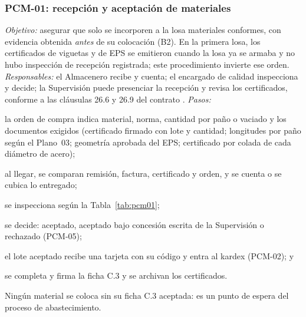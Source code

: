 \subsubsection{PCM-01: recepción y aceptación de materiales} \emph{Objetivo:} asegurar que solo se incorporen a la losa materiales conformes, con evidencia obtenida \emph{antes} de su colocación (B2). En la primera losa, los certificados de viguetas y de EPS se emitieron cuando la losa ya se armaba y no hubo inspección de recepción registrada; este procedimiento invierte ese orden. \emph{Responsables:} el Almacenero recibe y cuenta; el encargado de calidad inspecciona y decide; la Supervisión puede presenciar la recepción y revisa los certificados, conforme a las cláusulas 26.6 y 26.9 del contrato \parencite[p.~102]{uatf2025pao2}. \emph{Pasos:}
\begin{enumerate*}[label=(\arabic*)]
  \item la orden de compra indica material, norma, cantidad por paño o vaciado y los documentos exigidos (certificado firmado con lote y cantidad; longitudes por paño según el Plano~03; geometría aprobada del EPS; certificado por colada de cada diámetro de acero);
  \item al llegar, se comparan remisión, factura, certificado y orden, y se cuenta o se cubica lo entregado;
  \item se inspecciona según la Tabla~\ref{tab:pcm01};
  \item se decide: aceptado, aceptado bajo concesión escrita de la Supervisión o rechazado (PCM-05);
  \item el lote aceptado recibe una tarjeta con su código y entra al kardex (PCM-02); y
  \item se completa y firma la ficha C.3 y se archivan los certificados.
\end{enumerate*}
Ningún material se coloca sin su ficha C.3 aceptada: es un punto de espera del proceso de abastecimiento.

